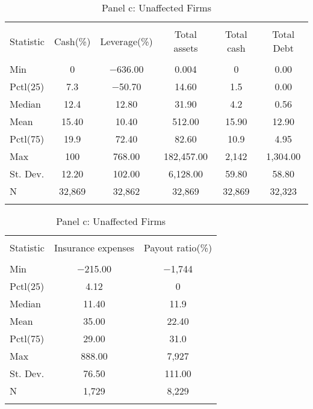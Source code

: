 \begin{table}[!htbp] \centering 
  \caption{Panel c: Unaffected Firms} 
  \label{} 
\begin{tabular}{@{\extracolsep{5pt}}lccccc} 
\\[-1.8ex]\hline 
\hline \\[-1.8ex] 
Statistic & Cash(\%) & Leverage(\%) & Total assets & Total cash & Total Debt \\ 
\hline \\[-1.8ex] 
Min & 0 & $-$636.00 & 0.004 & 0 & 0.00 \\ 
Pctl(25) & 7.3 & $-$50.70 & 14.60 & 1.5 & 0.00 \\ 
Median & 12.4 & 12.80 & 31.90 & 4.2 & 0.56 \\ 
Mean & 15.40 & 10.40 & 512.00 & 15.90 & 12.90 \\ 
Pctl(75) & 19.9 & 72.40 & 82.60 & 10.9 & 4.95 \\ 
Max & 100 & 768.00 & 182,457.00 & 2,142 & 1,304.00 \\ 
St. Dev. & 12.20 & 102.00 & 6,128.00 & 59.80 & 58.80 \\ 
N & 32,869 & 32,862 & 32,869 & 32,869 & 32,323 \\ 
\hline \\[-1.8ex] 
\end{tabular} 
\end{table} 

\begin{table}[!htbp] \centering 
  \caption{Panel c: Unaffected Firms} 
  \label{} 
\begin{tabular}{@{\extracolsep{5pt}}lcc} 
\\[-1.8ex]\hline 
\hline \\[-1.8ex] 
Statistic & Insurance expenses & Payout ratio(\%) \\ 
\hline \\[-1.8ex] 
Min & $-$215.00 & $-$1,744 \\ 
Pctl(25) & 4.12 & 0 \\ 
Median & 11.40 & 11.9 \\ 
Mean & 35.00 & 22.40 \\ 
Pctl(75) & 29.00 & 31.0 \\ 
Max & 888.00 & 7,927 \\ 
St. Dev. & 76.50 & 111.00 \\ 
N & 1,729 & 8,229 \\ 
\hline \\[-1.8ex] 
\end{tabular} 
\end{table} 
